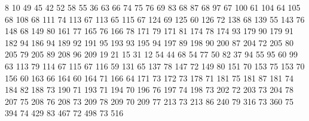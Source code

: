 8 10
49 45
42 52
58 55
36 63
66 74
75 76
69 83
68 87
68 97
67 100
61 104
64 105
68 108
68 111
74 113
67 113
65 115
67 124
69 125
60 126
72 138
68 139
55 143
76 148
68 149
80 161
77 165
76 166
78 171
79 171
81 174
78 174
93 179
90 179
91 182
94 186
94 189
92 191
95 193
93 195
94 197
89 198
90 200
87 204
72 205
80 205
79 205
89 208
96 209
19 21
15 31
12 54
44 68
54 77
50 82
37 94
55 95
60 99
63 113
79 114
67 115
67 116
59 131
65 137
78 147
72 149
80 151
70 153
75 153
70 156
60 163
66 164
60 164
71 166
64 171
73 172
73 178
71 181
75 181
87 181
74 184
82 188
73 190
71 193
71 194
70 196
76 197
74 198
73 202
72 203
73 204
78 207
75 208
76 208
73 209
78 209
70 209
77 213
73 213
86 240
79 316
73 360
75 394
74 429
83 467
72 498
73 516
